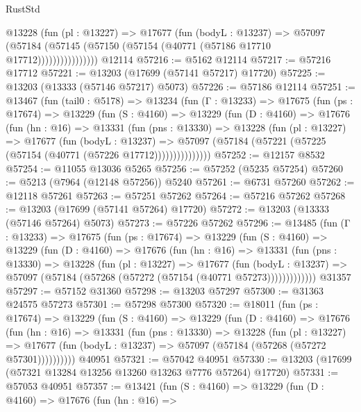 \begin{lexlean}{RustStd}
\begin{coremodule}
                  @13228
                    (fun (pl : @13227) =>
                    @17677
                      (fun (bodyL : @13237) =>
                      @57097
                        (@57184
                          (@57145 (@57150 (@57154 (@40771 (@57186 @17710 @17712))))))))))))))))
    @12114
@57216 := @5162 @12114
@57217 := @57216 @17712
@57221 := @13203 (@17699 (@57141 @57217) @17720)
@57225 := @13203 (@13333 (@57146 @57217) @5073)
@57226 := @57186 @12114
@57251 := @13467
    (fun (tail0 : @5178) =>
    @13234
      (fun (Γ : @13233) =>
      @17675
        (fun (ps : @17674) =>
        @13229
          (fun (S : @4160) =>
          @13229
            (fun (D : @4160) =>
            @17676
              (fun (hn : @16) =>
              @13331
                (fun (pns : @13330) =>
                @13228
                  (fun (pl : @13227) =>
                  @17677
                    (fun (bodyL : @13237) =>
                    @57097 (@57184 (@57221 (@57225 (@57154 (@40771 (@57226 @17712)))))))))))))))
@57252 := @12157 @8532
@57254 := @11055 @13036 @5265
@57256 := @57252 (@5235 @57254)
@57260 := @5213 (@7964 (@12148 @57256)) @5240
@57261 := @6731 @57260
@57262 := @12118 @57261
@57263 := @57251 @57262
@57264 := @57216 @57262
@57268 := @13203 (@17699 (@57141 @57264) @17720)
@57272 := @13203 (@13333 (@57146 @57264) @5073)
@57273 := @57226 @57262
@57296 := @13485
    (fun (Γ : @13233) =>
    @17675
      (fun (ps : @17674) =>
      @13229
        (fun (S : @4160) =>
        @13229
          (fun (D : @4160) =>
          @17676
            (fun (hn : @16) =>
            @13331
              (fun (pns : @13330) =>
              @13228
                (fun (pl : @13227) =>
                @17677
                  (fun (bodyL : @13237) =>
                  @57097 (@57184 (@57268 (@57272 (@57154 (@40771 @57273)))))))))))))
    @31357
@57297 := @57152 @31360
@57298 := @13203 @57297
@57300 := @31363 @24575 @57273
@57301 := @57298 @57300
@57320 := @18011
    (fun (ps : @17674) =>
    @13229
      (fun (S : @4160) =>
      @13229
        (fun (D : @4160) =>
        @17676
          (fun (hn : @16) =>
          @13331
            (fun (pns : @13330) =>
            @13228
              (fun (pl : @13227) =>
              @17677 (fun (bodyL : @13237) => @57097 (@57184 (@57268 (@57272 @57301))))))))))
    @40951
@57321 := @57042 @40951
@57330 := @13203 (@17699 (@57321 @13284 @13256 @13260 @13263 @7776 @57264) @17720)
@57331 := @57053 @40951
@57357 := @13421
    (fun (S : @4160) =>
    @13229
      (fun (D : @4160) =>
      @17676
        (fun (hn : @16) =>

\end{coremodule}
\end{lexlean}
